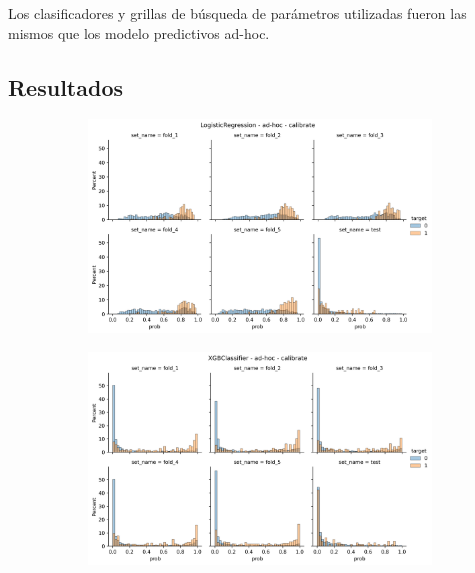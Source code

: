 Los clasificadores y grillas de búsqueda de parámetros utilizadas fueron las
mismos que los modelo predictivos ad-hoc.

\subsection{Resultados}

\begin{figure}
    \centering
    \begin{subfigure}[b]{0.83\textwidth}
    \includegraphics[width=\linewidth]{figures/results/ad-hoc/lgr/calibrate/calibrate__distplot.png}
    \end{subfigure}
    \hfill
    \centering
    \begin{subfigure}[b]{0.83\textwidth}
        \centering
        \includegraphics[width=\linewidth]{figures/results/ad-hoc/xgb/2021-12-07_06.29.19.600877__distplot (2).png}
    \end{subfigure}
    \hfill
    \centering
    \begin{subfigure}[b]{0.83\textwidth}

\end{subfigure}
\end{figure}
